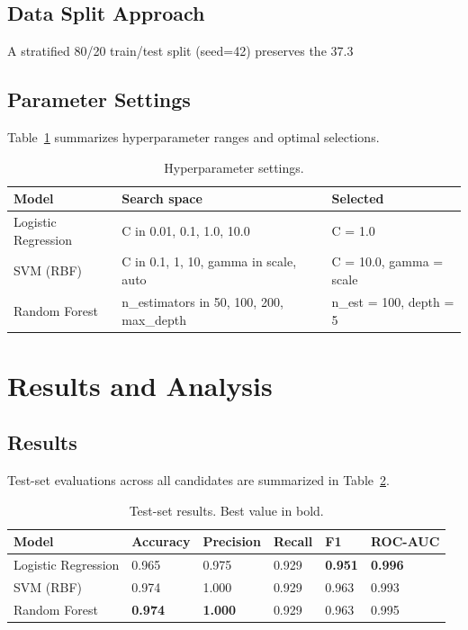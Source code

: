 \documentclass[conference]{IEEEtran}
\begin{document}
\subsection{Data Split Approach}
A stratified 80/20 train/test split (seed=42) preserves the 37.3%

\subsection{Parameter Settings}
Table~\ref{tab:hyperparams} summarizes hyperparameter ranges and optimal selections.

\begin{table}[htbp]
\caption{Hyperparameter settings.}
\label{tab:hyperparams}
\centering
\begin{tabular}{lll}
\toprule
\textbf{Model} & \textbf{Search space} & \textbf{Selected} \\
\midrule
Logistic Regression & C in {0.01, 0.1, 1.0, 10.0} & C = 1.0 \\
SVM (RBF) & C in {0.1, 1, 10}, gamma in {scale, auto} & C = 10.0, gamma = scale \\
Random Forest & n_estimators in {50, 100, 200}, max_depth & n_est = 100, depth = 5 \\
\bottomrule
\end{tabular}
\end{table}

\section{Results and Analysis}
\subsection{Results}
Test-set evaluations across all candidates are summarized in Table~\ref{tab:results}.

\begin{table}[htbp]
\caption{Test-set results. Best value in bold.}
\label{tab:results}
\centering
\begin{tabular}{llllll}
\toprule
\textbf{Model} & \textbf{Accuracy} & \textbf{Precision} & \textbf{Recall} & \textbf{F1} & \textbf{ROC-AUC} \\
\midrule
Logistic Regression & 0.965 & 0.975 & 0.929 & \textbf{0.951} & \textbf{0.996} \\
SVM (RBF) & 0.974 & 1.000 & 0.929 & 0.963 & 0.993 \\
Random Forest & \textbf{0.974} & \textbf{1.000} & 0.929 & 0.963 & 0.995 \\
\bottomrule
\end{tabular}
\end{table}
\end{document}
